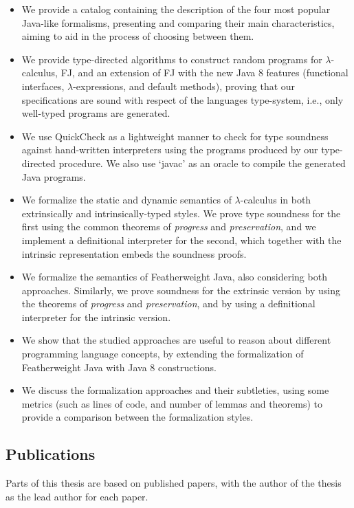 \documentclass[tese,capa,english]{texufpel}
\begin{document}
\begin{itemize}
\item We provide a catalog containing the description of the four most popular Java-like formalisms, presenting and comparing their main characteristics, aiming to aid in the process of choosing between them.
\item We provide type-directed algorithms to construct random programs for $\lambda$-calculus, FJ, and an extension of FJ with the new Java 8 features (functional interfaces, $\lambda$-expressions, and default methods), proving that our specifications are sound with respect of the languages type-system, i.e., only well-typed programs are generated.
\item We use QuickCheck as a lightweight manner to check for type soundness against hand-written interpreters using the programs produced by our type-directed procedure. We also use `javac' as an oracle to compile the generated Java programs.
\item We formalize the static and dynamic semantics of $\lambda$-calculus in both extrinsically and intrinsically-typed styles. We prove type soundness for the first using the common theorems of \emph{progress} and \emph{preservation}, and we implement a definitional interpreter for the second, which together with the intrinsic representation embeds the soundness proofs. 
\item We formalize the semantics of Featherweight Java, also considering both approaches. Similarly, we prove soundness for the extrinsic version by using the theorems of \emph{progress} and \emph{preservation}, and by using a definitional interpreter for the intrinsic version.
\item We show that the studied approaches are useful to reason about different programming language concepts, by extending the formalization of Featherweight Java with Java 8 constructions.
\item We discuss the formalization approaches and their subtleties, using some metrics (such as lines of code, and number of lemmas and theorems) to provide a comparison between the formalization styles.
\end{itemize}

\subsection{Publications}

Parts of this thesis are based on published papers, with the author of the thesis as the lead author for each paper.
\end{document}
